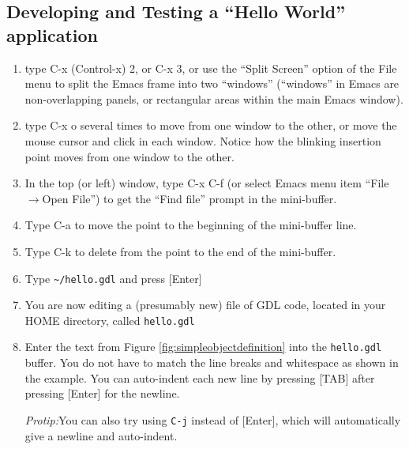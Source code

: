 \documentclass [11pt]{book}
\begin{document}
\subsection{Developing and Testing a  ``Hello World'' application}

\label{subsec:developingandtestingahelloworldapplication}

 

\begin{enumerate}

\item type C-x (Control-x) 2, or C-x 3, or use the ``Split
Screen'' option of the File menu to split the Emacs frame into two
``windows'' (``windows'' in Emacs are non-overlapping panels, or
rectangular areas within the main Emacs window).

\item type C-x o several times to move from one window to
the other, or move the mouse cursor and click in each window. Notice
how the blinking insertion point moves from one window to the other.

\item In the top (or left) window, type C-x C-f (or select Emacs menu item
``File$\rightarrow$Open File'') to get the ``Find file'' prompt in the
mini-buffer.

\item Type C-a to move the point to the beginning of the mini-buffer line.

\item Type C-k to delete from the point to the end of the mini-buffer.

\item Type \texttt{\textasciitilde/hello.gdl} and press [Enter]

\item You are now editing a (presumably new) file of GDL
	 code, located in your HOME directory, called \texttt{hello.gdl}

\item Enter the text from Figure 
\ref{fig:simpleobjectdefinition} into the \texttt{hello.gdl} buffer. You do not have to match the line breaks and whitespace as shown in the example.
You can auto-indent each new line by pressing [TAB] after pressing [Enter] for the newline.

\emph{Protip:}You can also try using \texttt{C-j} instead of [Enter], which will automatically give a newline and auto-indent.



\begin{figure}
\begin{lrbox}{\boxedverb}
\begin{minipage}{\linewidth}


\end{minipage}
\end{lrbox}
\end{figure}
\end{enumerate}
\end{document}
